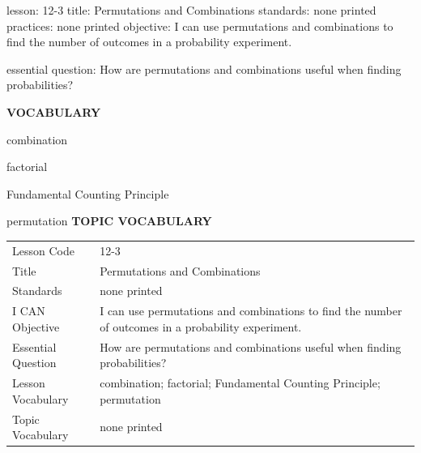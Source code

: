 \documentclass{article}
\newenvironment{lesson-meta}{}{}        %
\newcommand{\te}[1]{}                   %
\begin{document}
\begin{lesson-meta}
lesson: 12-3
title: Permutations and Combinations
standards: none printed
practices: none printed
objective: I can use permutations and combinations to find the number of outcomes in a probability experiment.

essential question: How are permutations and combinations useful when finding probabilities?

\textbf{VOCABULARY}
\item combination
\item factorial
\item Fundamental Counting Principle
\item permutation
\textbf{TOPIC VOCABULARY}
\te{No separate topic vocabulary list is printed on these pages.}
\begin{tabular}{ll}
Lesson Code & 12-3 \\
Title & Permutations and Combinations \\
Standards & none printed \\
I CAN Objective & I can use permutations and combinations to find the number of outcomes in a probability experiment. \\
Essential Question & How are permutations and combinations useful when finding probabilities? \\
Lesson Vocabulary & combination; factorial; Fundamental Counting Principle; permutation \\
Topic Vocabulary & none printed \\
\end{tabular}
\end{lesson-meta}
\end{document}
